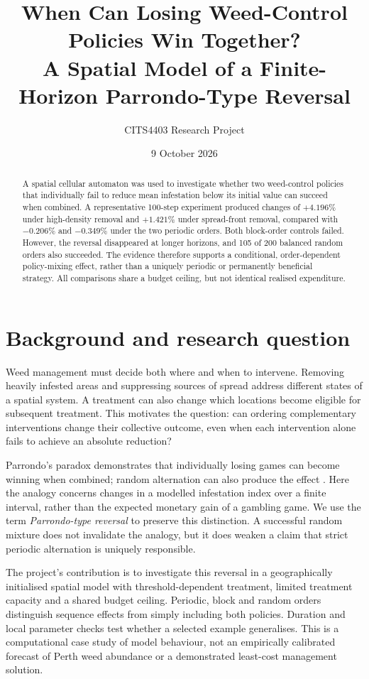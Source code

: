 \documentclass[a4paper,11pt]{article}
\title{When Can Losing Weed-Control Policies Win Together?\\A Spatial Model of a Finite-Horizon Parrondo-Type Reversal}
\author{CITS4403 Research Project}
\date{9 October 2026}
\begin{document}
\maketitle
\begin{abstract}
A spatial cellular automaton was used to investigate whether two weed-control policies that individually fail to reduce mean infestation below its initial value can succeed when combined. A representative 100-step experiment produced changes of $+4.196\%$ under high-density removal and $+1.421\%$ under spread-front removal, compared with $-0.206\%$ and $-0.349\%$ under the two periodic orders. Both block-order controls failed. However, the reversal disappeared at longer horizons, and 105 of 200 balanced random orders also succeeded. The evidence therefore supports a conditional, order-dependent policy-mixing effect, rather than a uniquely periodic or permanently beneficial strategy. All comparisons share a budget ceiling, but not identical realised expenditure.
\end{abstract}

\section{Background and research question}
Weed management must decide both where and when to intervene. Removing heavily infested areas and suppressing sources of spread address different states of a spatial system. A treatment can also change which locations become eligible for subsequent treatment. This motivates the question: can ordering complementary interventions change their collective outcome, even when each intervention alone fails to achieve an absolute reduction?

Parrondo's paradox demonstrates that individually losing games can become winning when combined; random alternation can also produce the effect \cite{harmer}. Here the analogy concerns changes in a modelled infestation index over a finite interval, rather than the expected monetary gain of a gambling game. We use the term \emph{Parrondo-type reversal} to preserve this distinction. A successful random mixture does not invalidate the analogy, but it does weaken a claim that strict periodic alternation is uniquely responsible.

The project's contribution is to investigate this reversal in a geographically initialised spatial model with threshold-dependent treatment, limited treatment capacity and a shared budget ceiling. Periodic, block and random orders distinguish sequence effects from simply including both policies. Duration and local parameter checks test whether a selected example generalises. This is a computational case study of model behaviour, not an empirically calibrated forecast of Perth weed abundance or a demonstrated least-cost management solution.
\end{document}
